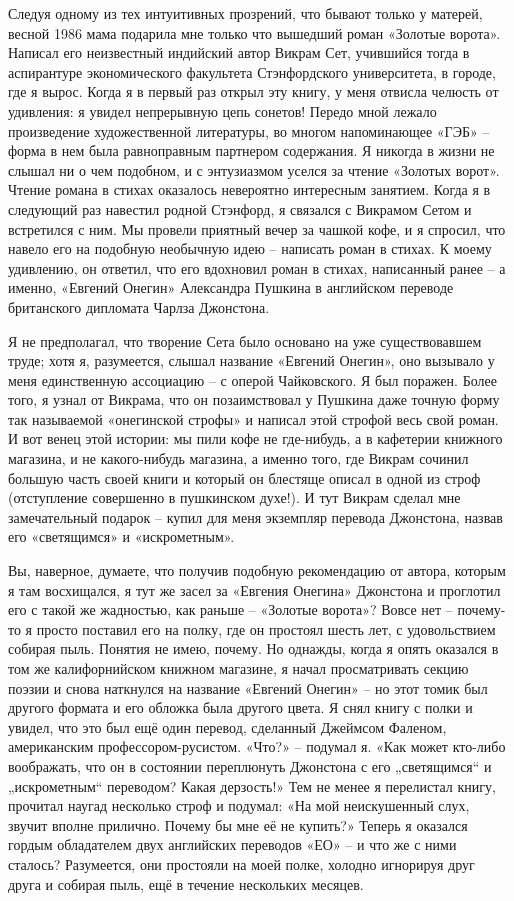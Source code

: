\documentclass[../main.tex]{subfiles}
\begin{document}
Следуя одному из тех интуитивных прозрений, что бывают только у матерей, весной 1986 мама подарила мне только что вышедший роман «Золотые ворота». Написал его неизвестный индийский автор Викрам Сет, учившийся тогда в аспирантуре экономического факультета Стэнфордского университета, в городе, где я вырос. Когда я в первый раз открыл эту книгу, у меня отвисла челюсть от удивления: я увидел непрерывную цепь сонетов! Передо мной лежало произведение художественной литературы, во многом напоминающее «ГЭБ» \--- форма в нем была равноправным партнером содержания. Я никогда в жизни не слышал ни о чем подобном, и с энтузиазмом уселся за чтение «Золотых ворот». Чтение романа в стихах оказалось невероятно интересным занятием. Когда я в следующий раз навестил родной Стэнфорд, я связался с Викрамом Сетом и встретился с ним. Мы провели приятный вечер за чашкой кофе, и я спросил, что навело его на подобную необычную идею \--- написать роман в стихах. К моему удивлению, он ответил, что его вдохновил роман в стихах, написанный ранее \--- а именно, «Евгений Онегин» Александра Пушкина в английском переводе британского дипломата Чарлза Джонстона.

Я не предполагал, что творение Сета было основано на уже существовавшем труде; хотя я, разумеется, слышал название «Евгений Онегин», оно вызывало у меня единственную ассоциацию \--- с оперой Чайковского. Я был поражен. Более того, я узнал от Викрама, что он позаимствовал у Пушкина даже точную форму так называемой «онегинской строфы» и написал этой строфой весь свой роман. И вот венец этой истории: мы пили кофе не где-нибудь, а в кафетерии книжного магазина, и не какого-нибудь магазина, а именно того, где Викрам сочинил большую часть своей книги и который он блестяще описал в одной из строф (отступление совершенно в пушкинском духе!). И тут Викрам сделал мне замечательный подарок \--- купил для меня экземпляр перевода Джонстона, назвав его «светящимся» и «искрометным».

Вы, наверное, думаете, что получив подобную рекомендацию от автора, которым я там восхищался, я тут же засел за «Евгения Онегина» Джонстона и проглотил его с такой же жадностью, как раньше \--- «Золотые ворота»? Вовсе нет \--- почему-то я просто поставил его на полку, где он простоял шесть лет, с удовольствием собирая пыль. Понятия не имею, почему. Но однажды, когда я опять оказался в том же калифорнийском книжном магазине, я начал просматривать секцию поэзии и снова наткнулся на название «Евгений Онегин» \--- но этот томик был другого формата и его обложка была другого цвета. Я снял книгу с полки и увидел, что это был ещё один перевод, сделанный Джеймсом Фаленом, американским профессором-русистом. «Что?» \--- подумал я. «Как может кто-либо воображать, что он в состоянии переплюнуть Джонстона с его „светящимся`` и „искрометным`` переводом? Какая дерзость!» Тем не менее я перелистал книгу, прочитал наугад несколько строф и подумал: «На мой неискушенный слух, звучит вполне прилично. Почему бы мне её не купить?» Теперь я оказался гордым обладателем двух английских переводов «ЕО» \--- и что же с ними сталось? Разумеется, они простояли на моей полке, холодно игнорируя друг друга и собирая пыль, ещё в течение нескольких месяцев.
\end{document}

